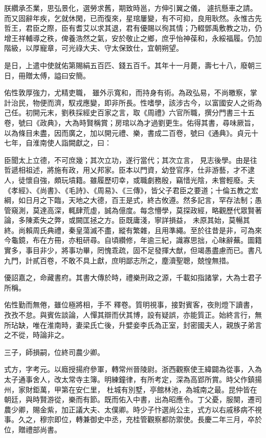 \begin{pinyinscope}
 朕纘承丕業，思弘景化，選勞求舊，期致時邕，方伸引翼之儀，
 遽抗懸車之請。而又固辭年疾，乞就休閑，已而復來，星琯屢變，有不可抑，良用耿然。永惟古先哲王，君臣之際，臣有耆艾以求其退，君有優賜以徇其情；乃輟鄧禹敷教之功，仍增王祥輔導之秩，俾養浩然之氣，安於敬止之鄉，庶乎怡神葆和，永綏福履。仍加階級，以厚寵章，可光祿大夫、守太保致仕，宜朝朔望。



 是日，上遣中使就佑第賜絹五百匹、錢五百千。其年十一月薨，壽七十八，廢朝三日，冊贈太傅，謚曰安簡。



 佑性敦厚強力，尤精吏職，
 雖外示寬和，而持身有術。為政弘易，不尚皦察，掌計治民，物便而濟，馭戎應變，即非所長。性嗜學，該涉古今，以富國安人之術為己任。初開元末，劉秩採經史百家之言，取《周禮》六官所職，撰分門書三十五卷，號曰《政典》，大為時賢稱賞；房琯以為才過劉更生。佑得其書，尋味厥旨，以為條目未盡，因而廣之，加以開元禮、樂，書成二百卷，號曰《通典》。貞元十七年，自淮南使人詣闕獻之，曰：



 臣聞太上立德，不可庶幾；其次立功，遂行當代；其次立言，
 見志後學。由是往哲遞相祖述，將施有政，用乂邦家。臣本以門資，幼登官序，仕非游藝，才不逮人，徒懷自強，頗玩墳籍。雖履歷叨幸，或職劇務殷，竊惜光陰，未嘗輕廢。夫《孝經》、《尚書》、《毛詩》、《周易》、《三傳》，皆父子君臣之要道；十倫五教之宏綱，如日月之下臨，天地之大德，百王是式，終古攸遵。然多記言，罕存法制；愚管窺測，莫達高深，輒肆荒虛，誠為億度。每念懵學，莫探政經，略觀歷代眾賢著論，多陳紊失之弊，或闕匡拯之方。臣既庸淺，寧詳損益，
 未原其始，莫暢其終。尚賴周氏典禮，秦皇蕩滅不盡，縱有繁雜，且用準繩。至於往昔是非，可為來今龜鏡，布在方冊，亦粗研尋。自頃纘修，年逾三紀，識寡思拙，心昧辭蕪。圖籍實多，事目非少，將事功畢，罔愧乖疏，固不足發揮大猷，但竭愚盡慮而已。書凡九門，計貳百卷，不敢不具上獻，庶明鄙志所之，塵瀆聖聰，兢惶無措。



 優詔嘉之，命藏書府。其書大傳於時，禮樂刑政之源，千載如指諸掌，大為士君子所稱。



 佑性勤而無倦，雖位極將相，手不
 釋卷。質明視事，接對賓客，夜則燈下讀書，孜孜不怠。與賓佐談論，人憚其辯而伏其博，設有疑誤，亦能質正。始終言行，無所玷缺，唯在淮南時，妻梁氏亡後，升嬖妾李氏為正室，封密國夫人，親族子弟言之不從，時論非之。



 三子，師損嗣，位終司農少卿。



 式方，字考元。以廕授揚府參軍，轉常州晉陵尉。浙西觀察使王緯闢為從事，入為太子通事舍人，改太常寺主簿。明練鐘律，有所考定，深為高郢所賞。時父作鎮揚州，家財鉅萬，甲第在安仁里，
 杜城有別墅，亭館林池，為城南之最。昆仲皆在朝廷，與時賢游從，樂而有節。既而佑入中書，出為昭應令。丁父憂，服闋，遷司農少卿，賜金紫，加正議大夫、太僕卿。時少子忭選尚公主，式方以右戚移病不視事。久之，穆宗即位，轉兼御史中丞，充桂管觀察都防禦使。長慶二年三月，卒於位，贈禮部尚書。




\end{pinyinscope}
